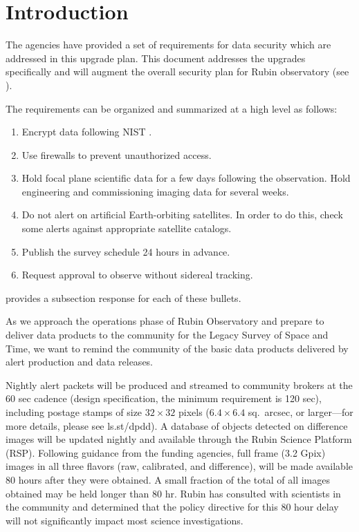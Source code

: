 \section{Introduction}

The agencies have provided a set of requirements for data security which are addressed in this upgrade plan.  This document addresses the upgrades specifically and will augment the overall security plan for Rubin observatory (see ).

The requirements can be organized and summarized at a high level as follows:
\begin{enumerate}

\item	Encrypt data following \gls{NIST} .
\item	Use firewalls to prevent unauthorized  access.
\item	Hold focal plane scientific data for a few days following the observation. Hold engineering and commissioning imaging data for several weeks.
\item	Do not alert on artificial Earth-orbiting satellites.
In order to do this, check some alerts against appropriate satellite catalogs.
\item	Publish the survey schedule 24 hours in advance.
\item	Request approval to observe without sidereal tracking.

\end{enumerate}

 provides a subsection response for each of these bullets.

As we approach the operations phase of Rubin Observatory and prepare to deliver data products to the community for the Legacy Survey of Space and Time, we want to remind the community of the basic data products delivered by alert production and data releases.

Nightly alert packets will be produced and streamed to community brokers at the 60 sec cadence (design specification, the minimum requirement is 120 sec), including postage stamps of size $32 \times 32$ pixels ($6.4 \times 6.4$ sq.\ arcsec, or larger---for more details, please see ls.st/dpdd). 
A database of objects detected on difference images will be updated nightly and available through the Rubin Science Platform (RSP). 
Following guidance from the funding agencies, full frame (3.2 Gpix) images in all three flavors (raw, calibrated, and difference), will be made available 80 hours after they were obtained.
A small fraction of the total of all images obtained may be held longer than 80 hr. 
Rubin has consulted with scientists in the community and determined that the policy directive for this 80 hour delay will not significantly impact most science investigations.

